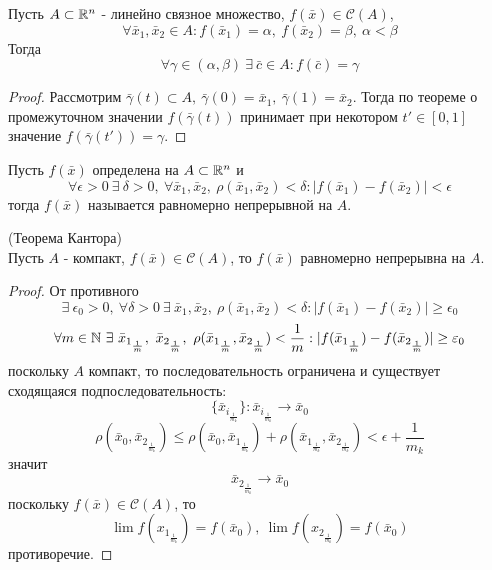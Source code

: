 \begin{theorem}
    Пусть $A\subset \mathbb{R}^n$ - линейно связное множество, $f(\bar{x})\in \mathcal{C}(A)$,
    \[\forall \bar{x}_1, \bar{x}_2\in A: f(\bar{x}_1)=\alpha,\ f(\bar{x}_2)=\beta,\ \alpha<\beta\]
    Тогда
    \[\forall \gamma\in (\alpha, \beta)\ \exists\ \bar{c}\in A: f(\bar{c})=\gamma\]
\end{theorem} 
\begin{proof}
    Рассмотрим $\bar{\gamma}(t)\subset A,\ \bar{\gamma}(0)=\bar{x}_1,\ \bar{\gamma}(1)=\bar{x}_2$. Тогда по теореме о промежуточном значении $f(\bar{\gamma}(t))$ принимает при некотором $t'\in [0,1]$ значение $f(\bar{\gamma}(t'))=\gamma$.
\end{proof} 
\begin{definition}
    Пусть $f(\bar{x})$ определена на $A\subset \mathbb{R}^n$ и
    \[\forall \epsilon>0\ \exists\ \delta>0,\ \forall \bar{x}_1, \bar{x}_2,\ \rho(\bar{x}_1, \bar{x}_2)<\delta: |f(\bar{x}_1)-f(\bar{x}_2)|<\epsilon\] 
    тогда $f(\bar{x})$ называется равномерно непрерывной на $A$.
\end{definition} 
\begin{theorem} (Теорема Кантора)\\
    Пусть $A$ - компакт, $f(\bar{x})\in \mathcal{C}(A)$, то $f(\bar{x})$ равномерно непрерывна на $A$.
\end{theorem} 
\begin{proof}
    От противного 
    \[\exists\ \epsilon_0>0,\ \forall \delta>0\ \exists\ \bar{x}_{1}, \bar{x}_2,\ \rho(\bar{x}_1, \bar{x}_2)<\delta: |f(\bar{x}_1)-f(\bar{x}_2)|\geq \epsilon_0\]
    \[\forall m\in \N\ \exists\ \bar{x}_{1_{\frac{1}{m}}},\ \bar{x}_{2_{\frac{1}{m}}},\ \rho(\bar{x}_{1_{\frac{1}{m}}}, \bar{x}_{2_{\frac{1}{m}}})<\frac{1}{m}: |f(\bar{x}_{1_{\frac{1}{m}}})-f(\bar{x}_{2_{\frac{1}{m}}})|\geq \epsilon_0\]
    поскольку $A$ компакт, то последовательность ограничена и существует сходящаяся подпоследовательность:
    \[\{\bar{x}_{i_{\frac{1}{m_k}}}\}: \bar{x}_{i_{\frac{1}{m_k}}}\to \bar{x}_0\]
    \[\rho(\bar{x}_0, \bar{x}_{2_{\frac{1}{m_k}}})\leq \rho(\bar{x}_0, \bar{x}_{1_{\frac{1}{m_k}}})+\rho(\bar{x}_{1_{\frac{1}{m_k}}}, \bar{x}_{2_{\frac{1}{m_k}}})<\epsilon+\frac{1}{m_k}\]
    значит 
    \[\bar{x}_{2_{\frac{1}{m_k}}}\to \bar{x}_0\]
    поскольку $f(\bar{x})\in \mathcal{C}(A)$, то
    \[\lim\limits f(x_{1_{\frac{1}{m_k}}})=f(\bar{x}_0),\ \lim\limits f(x_{2_{\frac{1}{m_k}}})=f(\bar{x}_0)\]
    противоречие.
\end{proof} 
